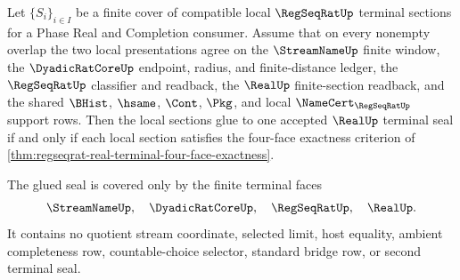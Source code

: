 \begin{theorem}
\label{thm:regseqrat-four-face-local-gluing-real-seal-coverage}
Let $\{S_i\}_{i \in I}$ be a finite cover of compatible local
$\RegSeqRatUp$ terminal sections for a Phase Real and Completion consumer.
Assume that on every nonempty overlap the two local presentations agree on
the $\StreamNameUp$ finite window, the $\DyadicRatCoreUp$ endpoint, radius,
and finite-distance ledger, the $\RegSeqRatUp$ classifier and readback, the
$\RealUp$ finite-section readback, and the shared $\BHist$, $\hsame$, $\Cont$,
$\Pkg$, and local $\NameCert_{\RegSeqRatUp}$ support rows. Then the local
sections glue to one accepted $\RealUp$ terminal seal if and only if each
local section satisfies the four-face exactness criterion of
\autoref{thm:regseqrat-real-terminal-four-face-exactness}.

The glued seal is covered only by the finite terminal faces
$$
\StreamNameUp,\quad \DyadicRatCoreUp,\quad \RegSeqRatUp,\quad \RealUp.
$$
It contains no quotient stream coordinate, selected limit, host equality,
ambient completeness row, countable-choice selector, standard bridge row, or
second terminal seal.
\end{theorem}
